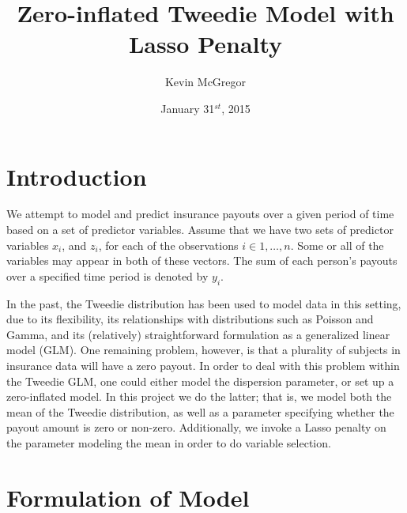 \documentclass{article}\usepackage[]{graphicx}\usepackage[]{color}
\title{Zero-inflated Tweedie Model with Lasso Penalty}
\author{Kevin McGregor}
\date{January 31$^{st}$, 2015}
\begin{document}
\maketitle

\section*{Introduction}
We attempt to model and predict insurance payouts over a given period of time based on a set of predictor variables.  Assume that we have two sets of predictor variables $x_i$, and $z_i$, for each of the observations $i \in 1,\dots,n$. Some or all of the variables may appear in both of these vectors. The sum of each person's payouts over a specified time period is denoted by $y_i$.

In the past, the Tweedie distribution has been used to model data in this setting, due to its flexibility, its relationships with distributions such as Poisson and Gamma, and its (relatively) straightforward formulation as a generalized linear model (GLM).  One remaining problem, however, is that a plurality of subjects in insurance data will have a zero payout.  In order to deal with this problem within the Tweedie GLM, one could either model the dispersion parameter, or set up a zero-inflated model.  In this project we do the latter; that is, we model both the mean of the Tweedie distribution, as well as a parameter specifying whether the payout amount is zero or non-zero.  Additionally, we invoke a Lasso penalty on the parameter  modeling the mean in order to do variable selection.


\section*{Formulation of Model}
\end{document}
